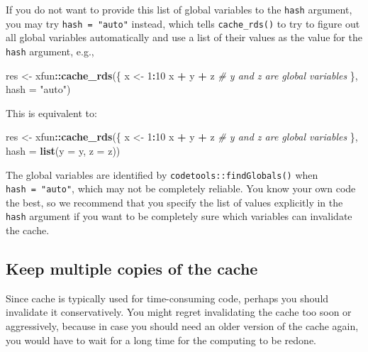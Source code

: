 \documentclass[
  11pt,
]{krantz}
\newenvironment{Shaded}{\begin{snugshade}}{\end{snugshade}}
\newcommand{\CommentTok}[1]{\textcolor[rgb]{0.37,0.37,0.37}{\textit{#1}}}
\newcommand{\DataTypeTok}[1]{\textcolor[rgb]{0.27,0.27,0.27}{#1}}
\newcommand{\DecValTok}[1]{\textcolor[rgb]{0.06,0.06,0.06}{#1}}
\newcommand{\KeywordTok}[1]{\textcolor[rgb]{0.27,0.27,0.27}{\textbf{#1}}}
\newcommand{\NormalTok}[1]{#1}
\newcommand{\OperatorTok}[1]{\textcolor[rgb]{0.43,0.43,0.43}{\textbf{#1}}}
\newcommand{\StringTok}[1]{\textcolor[rgb]{0.5,0.5,0.5}{#1}}
\begin{document}
If you do not want to provide this list of global variables to the \texttt{hash} argument, you may try \texttt{hash\ =\ "auto"} instead, which tells \texttt{cache\_rds()} to try to figure out all global variables automatically and use a list of their values as the value for the \texttt{hash} argument, e.g.,

\begin{Shaded}
\begin{Highlighting}[]
\NormalTok{res <-}\StringTok{ }\NormalTok{xfun}\OperatorTok{::}\KeywordTok{cache_rds}\NormalTok{(\{}
\NormalTok{  x <-}\StringTok{ }\DecValTok{1}\OperatorTok{:}\DecValTok{10}
\NormalTok{  x }\OperatorTok{+}\StringTok{ }\NormalTok{y }\OperatorTok{+}\StringTok{ }\NormalTok{z  }\CommentTok{# y and z are global variables}
\NormalTok{\}, }\DataTypeTok{hash =} \StringTok{"auto"}\NormalTok{)}
\end{Highlighting}
\end{Shaded}

This is equivalent to:

\begin{Shaded}
\begin{Highlighting}[]
\NormalTok{res <-}\StringTok{ }\NormalTok{xfun}\OperatorTok{::}\KeywordTok{cache_rds}\NormalTok{(\{}
\NormalTok{  x <-}\StringTok{ }\DecValTok{1}\OperatorTok{:}\DecValTok{10}
\NormalTok{  x }\OperatorTok{+}\StringTok{ }\NormalTok{y }\OperatorTok{+}\StringTok{ }\NormalTok{z  }\CommentTok{# y and z are global variables}
\NormalTok{\}, }\DataTypeTok{hash =} \KeywordTok{list}\NormalTok{(}\DataTypeTok{y =}\NormalTok{ y, }\DataTypeTok{z =}\NormalTok{ z))}
\end{Highlighting}
\end{Shaded}

The global variables are identified by \texttt{codetools::findGlobals()} when \texttt{hash\ =\ "auto"}, which may not be completely reliable. You know your own code the best, so we recommend that you specify the list of values explicitly in the \texttt{hash} argument if you want to be completely sure which variables can invalidate the cache.

\hypertarget{keep-multiple-copies-of-the-cache}{%
\subsection{Keep multiple copies of the cache}\label{keep-multiple-copies-of-the-cache}}

Since cache is typically used for time-consuming code, perhaps you should invalidate it conservatively. You might regret invalidating the cache too soon or aggressively, because in case you should need an older version of the cache again, you would have to wait for a long time for the computing to be redone.
\end{document}
